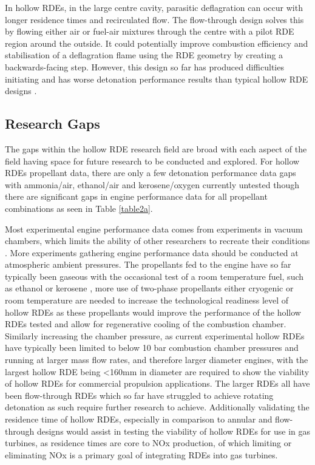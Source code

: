 \documentclass{article}
\begin{document}
In hollow RDEs, in the large centre cavity, parasitic deflagration can occur with longer residence times and recirculated flow. The flow-through design solves this by flowing either air or fuel-air mixtures through the centre with a pilot RDE region around the outside. It could potentially improve combustion efficiency and stabilisation of a deflagration flame using the RDE geometry by creating a backwards-facing step. However, this design so far has produced difficulties initiating and has worse detonation performance results than typical hollow RDE designs \cite{Wiggins2023,Zhang2021,Wiggins2021}. 

\subsection{Research Gaps}

The gaps within the hollow RDE research field are broad with each aspect of the field having space for future research to be conducted and explored. For hollow RDEs propellant data, there are only a few detonation performance data gaps with ammonia/air, ethanol/air and kerosene/oxygen currently untested though there are significant gaps in engine performance data for all propellant combinations as seen in Table \ref{table2a}.
\par

Most experimental engine performance data comes from experiments in vacuum chambers, which limits the ability of other researchers to recreate their conditions \cite{Lin2020,Wang2022,Zhang2017,Rong2022,1Zhang2021,2Rong2022,Peng2018}. More experiments gathering engine performance data should be conducted at atmospheric ambient pressures. The propellants fed to the engine have so far typically been gaseous with the occasional test of a room temperature fuel, such as ethanol \cite{1ISHIHARA2023} or kerosene \cite{Xue2022,Zhao2022}, more use of two-phase propellants either cryogenic or room temperature are needed to increase the technological readiness level of hollow RDEs as these propellants would improve the performance of the hollow RDEs tested and allow for regenerative cooling of the combustion chamber. Similarly increasing the chamber pressure, as current experimental hollow RDEs have typically been limited to below 10 bar combustion chamber pressures \cite{Wang2019} and running at larger mass flow rates, and therefore larger diameter engines, with the largest hollow RDE being <160mm in diameter \cite{Wiggins2023,Wiggins2021,1Wiggins2023,1Wiggins2021} are required to show the viability of hollow RDEs for commercial propulsion applications. The larger RDEs all have been flow-through RDEs which so far have struggled to achieve rotating detonation as such require further research to achieve. Additionally validating the residence time of hollow RDEs, especially in comparison to annular and flow-through designs would assist in testing the viability of hollow RDEs for use in gas turbines, as residence times are core to NOx production, of which limiting or eliminating NOx is a primary goal of integrating RDEs into gas turbines.
\par
\end{document}
